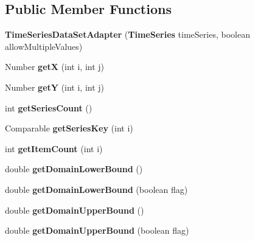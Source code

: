 \subsection*{Public Member Functions}
\begin{DoxyCompactItemize}
\item 
{\bf Time\-Series\-Data\-Set\-Adapter} ({\bf Time\-Series} time\-Series, boolean allow\-Multiple\-Values)
\item 
Number {\bfseries get\-X} (int i, int j)\label{classdesmoj_1_1extensions_1_1grafic_1_1util_1_1_time_series_data_set_adapter_a6023a16b2bac0abcd02802750fc628d6}

\item 
Number {\bfseries get\-Y} (int i, int j)\label{classdesmoj_1_1extensions_1_1grafic_1_1util_1_1_time_series_data_set_adapter_a58e0c0bef59c5b3031c4f237e4bd6e6f}

\item 
int {\bfseries get\-Series\-Count} ()\label{classdesmoj_1_1extensions_1_1grafic_1_1util_1_1_time_series_data_set_adapter_a6915173f60934ce213aa2638579e35cb}

\item 
Comparable {\bfseries get\-Series\-Key} (int i)\label{classdesmoj_1_1extensions_1_1grafic_1_1util_1_1_time_series_data_set_adapter_a2e9b59353066d64fd2202c19d252f082}

\item 
int {\bfseries get\-Item\-Count} (int i)\label{classdesmoj_1_1extensions_1_1grafic_1_1util_1_1_time_series_data_set_adapter_a45de4187aa41f7789aa8c62411ffa39e}

\item 
double {\bfseries get\-Domain\-Lower\-Bound} ()\label{classdesmoj_1_1extensions_1_1grafic_1_1util_1_1_time_series_data_set_adapter_a71ab0675666eeb7784cf509b946847dd}

\item 
double {\bfseries get\-Domain\-Lower\-Bound} (boolean flag)\label{classdesmoj_1_1extensions_1_1grafic_1_1util_1_1_time_series_data_set_adapter_a6eed6bf6e0b46b4978beca0db16c5cc2}

\item 
double {\bfseries get\-Domain\-Upper\-Bound} ()\label{classdesmoj_1_1extensions_1_1grafic_1_1util_1_1_time_series_data_set_adapter_a5705e647797c57cea191ecb10c05a5b8}

\item 
double {\bfseries get\-Domain\-Upper\-Bound} (boolean flag)\label{classdesmoj_1_1extensions_1_1grafic_1_1util_1_1_time_series_data_set_adapter_a4835a761f9e50852b453a3ff9b1fbe1e}


\end{DoxyCompactItemize}
